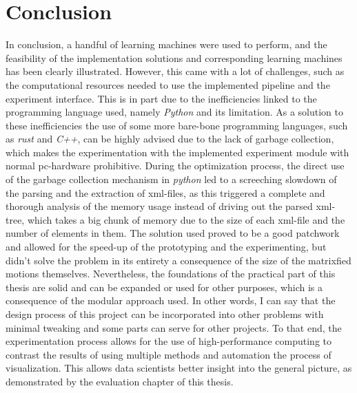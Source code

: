 \chapter{Conclusion}
In conclusion, a handful of learning machines were used to perform, and the feasibility of the implementation solutions and corresponding learning machines has been clearly illustrated. However, this came with a lot of challenges, such as the computational resources needed to use the implemented pipeline and the experiment interface. This is in part due to the inefficiencies linked to the programming language used, namely \textit{Python} and its limitation.\newline
As a solution to these inefficiencies the use of some more bare-bone programming languages, such as \textit{rust} and \textit{C++}, can be highly advised due to the lack of garbage collection, which makes the experimentation with the implemented experiment module with normal pc-hardware prohibitive. During the optimization process, the direct use of the garbage collection mechanism in \textit{python} led to a screeching slowdown of the parsing and the extraction of xml-files, as this triggered a complete and thorough analysis of the memory usage instead of driving out the parsed xml-tree, which takes a big chunk of memory due to the size of each xml-file and the number of elements in them. The solution used proved to be a good patchwork and allowed for the speed-up of the prototyping and the experimenting, but didn't solve the problem in its entirety a consequence of the size of the matrixfied motions themselves.\newline
Nevertheless, the foundations of the practical part of this thesis are solid and can be expanded or used for other purposes, which is a consequence of the modular approach used. In other words, I can say that the design process of this project can be incorporated into other problems with minimal tweaking and some parts can serve for other projects. To that end, the experimentation process allows for the use of high-performance computing to contrast the results of using multiple methods and automation the process of visualization. This allows data scientists better insight into the general picture, as demonstrated by the evaluation chapter of this thesis.\newline
